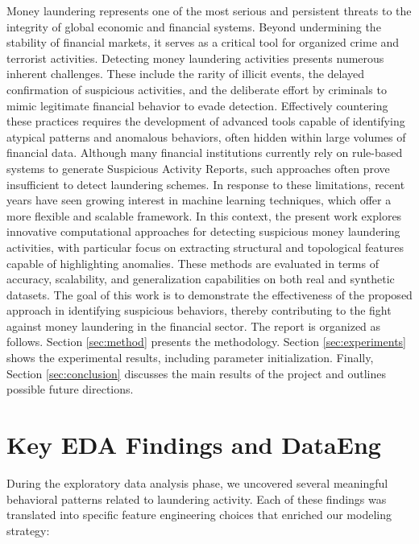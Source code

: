\documentclass[a4paper]{article}
\begin{document}
Money laundering represents one of the most serious and persistent threats to the integrity of global economic and financial systems. Beyond undermining the stability of financial markets, it serves as a critical tool for organized crime and terrorist activities.
Detecting money laundering activities presents numerous inherent challenges. These include the rarity of illicit events, the delayed confirmation of suspicious activities, and the deliberate effort by criminals to mimic legitimate financial behavior to evade detection.
Effectively countering these practices requires the development of advanced tools capable of identifying atypical patterns and anomalous behaviors, often hidden within large volumes of financial data. Although many financial institutions currently rely on rule-based systems to generate Suspicious Activity Reports, such approaches often prove insufficient to detect laundering schemes.
In response to these limitations, recent years have seen growing interest in machine learning techniques, which offer a more flexible and scalable framework. In this context, the present work explores innovative computational approaches for detecting suspicious money laundering activities, with particular focus on extracting structural and topological features capable of highlighting anomalies. These methods are evaluated in terms of accuracy, scalability, and generalization capabilities on both real and synthetic datasets.
The goal of this work is to demonstrate the effectiveness of the proposed approach in identifying suspicious behaviors, thereby contributing to the fight against money laundering in the financial sector.
The report is organized as follows. Section \ref{sec:method} presents the methodology. Section \ref{sec:experiments} shows the experimental results, including parameter initialization. Finally, Section \ref{sec:conclusion} discusses the main results of the project and outlines possible future directions.

\section{Key EDA Findings and DataEng}

During the exploratory data analysis phase, we uncovered several meaningful behavioral patterns related to laundering activity. Each of these findings was translated into specific feature engineering choices that enriched our modeling strategy:
\end{document}
